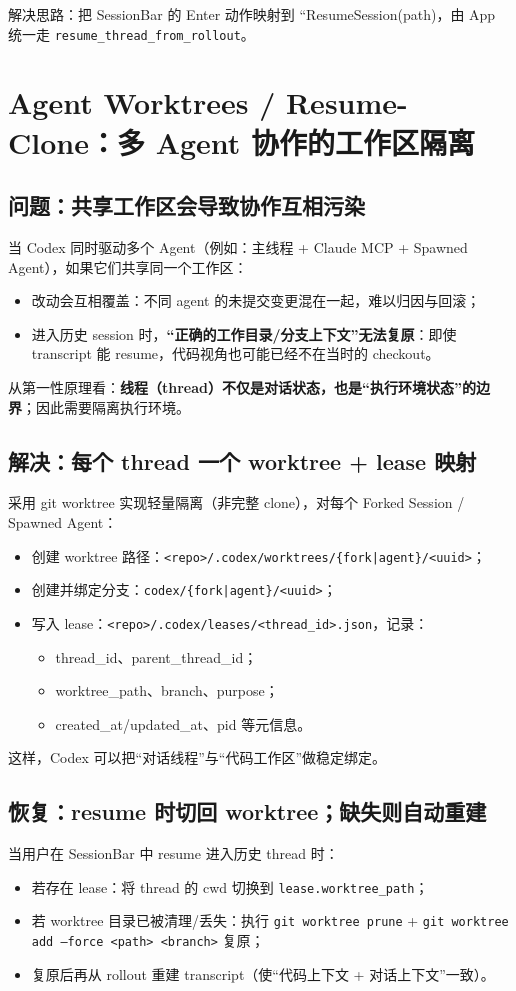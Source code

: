 \documentclass[UTF8,11pt]{ctexart}
\begin{document}
解决思路：把 SessionBar 的 Enter 动作映射到 ``ResumeSession(path)，由 App 统一走 \texttt{resume\_thread\_from\_rollout}。

\section{Agent Worktrees / Resume-Clone：多 Agent 协作的工作区隔离}
\subsection{问题：共享工作区会导致协作互相污染}
当 Codex 同时驱动多个 Agent（例如：主线程 + Claude MCP + Spawned Agent），如果它们共享同一个工作区：
\begin{itemize}[nosep]
  \item 改动会互相覆盖：不同 agent 的未提交变更混在一起，难以归因与回滚；
  \item 进入历史 session 时，\textbf{“正确的工作目录/分支上下文”无法复原}：即使 transcript 能 resume，代码视角也可能已经不在当时的 checkout。
\end{itemize}
从第一性原理看：\textbf{线程（thread）不仅是对话状态，也是“执行环境状态”的边界}；因此需要隔离执行环境。

\subsection{解决：每个 thread 一个 worktree + lease 映射}
采用 git worktree 实现轻量隔离（非完整 clone），对每个 Forked Session / Spawned Agent：
\begin{itemize}[nosep]
  \item 创建 worktree 路径：\texttt{<repo>/.codex/worktrees/\{fork|agent\}/<uuid>}；
  \item 创建并绑定分支：\texttt{codex/\{fork|agent\}/<uuid>}；
  \item 写入 lease：\texttt{<repo>/.codex/leases/<thread\_id>.json}，记录：
    \begin{itemize}[nosep]
      \item thread\_id、parent\_thread\_id；
      \item worktree\_path、branch、purpose；
      \item created\_at/updated\_at、pid 等元信息。
    \end{itemize}
\end{itemize}
这样，Codex 可以把“对话线程”与“代码工作区”做稳定绑定。

\subsection{恢复：resume 时切回 worktree；缺失则自动重建}
当用户在 SessionBar 中 resume 进入历史 thread 时：
\begin{itemize}[nosep]
  \item 若存在 lease：将 thread 的 cwd 切换到 \texttt{lease.worktree\_path}；
  \item 若 worktree 目录已被清理/丢失：执行 \texttt{git worktree prune} + \texttt{git worktree add --force <path> <branch>} 复原；
  \item 复原后再从 rollout 重建 transcript（使“代码上下文 + 对话上下文”一致）。
\end{itemize}
\end{document}
